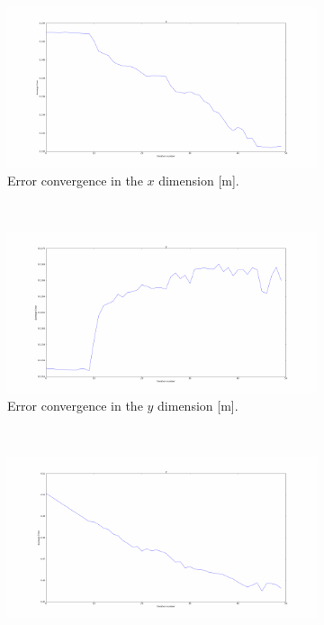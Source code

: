 \begin{figure}
  \centering
  \begin{subfigure}{0.45\textwidth}
    \includegraphics[width=\textwidth]{figures/chapter3/err_x.pdf}
    \caption{Error convergence in the $x$ dimension [m].}
\label{fig:err-convergence-x}
  \end{subfigure}
~
  \begin{subfigure}{0.45\textwidth}
    \includegraphics[width=\textwidth]{figures/chapter3/err_y.pdf}
    \caption{Error convergence in the $y$ dimension [m].}
\label{fig:err-convergence-y}
  \end{subfigure}
~
\begin{subfigure}{0.45\textwidth}
    \includegraphics[width=\textwidth]{figures/chapter3/err_z.pdf}

\end{subfigure}
\end{figure}
